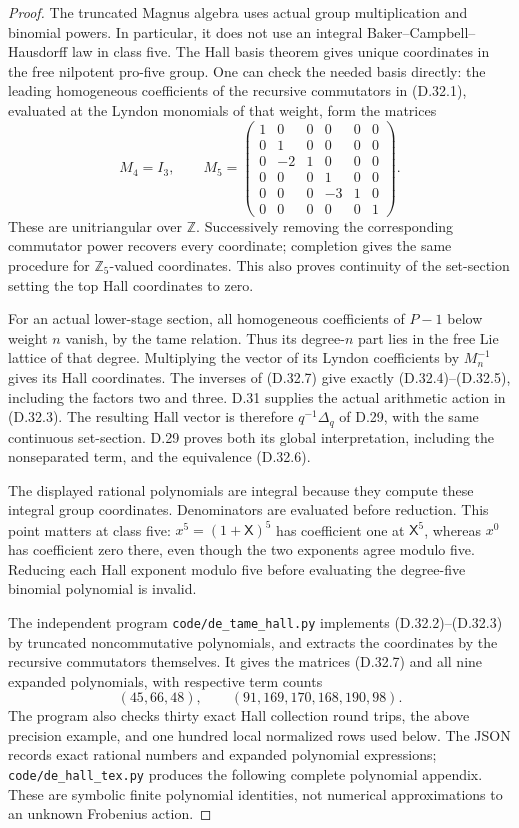 \begin{proof}
The truncated Magnus algebra uses actual group
multiplication and binomial powers. In particular,
it does not use an integral Baker--Campbell--Hausdorff
law in class five. The Hall basis theorem gives
unique coordinates in the free nilpotent
pro-five group. One can check the needed basis
directly: the leading homogeneous coefficients
of the recursive commutators in (D.32.1),
evaluated at the Lyndon monomials of that weight,
form the matrices
\[
 M_4=I_3,\qquad
 M_5=\begin{pmatrix}
 1&0&0&0&0&0\\
 0&1&0&0&0&0\\
 0&-2&1&0&0&0\\
 0&0&0&1&0&0\\
 0&0&0&-3&1&0\\
 0&0&0&0&0&1
 \end{pmatrix}.                                \tag{D.32.7}
\]
These are unitriangular over \(\mathbb Z\).
Successively removing the corresponding
commutator power recovers every coordinate;
completion gives the same procedure for
\(\mathbb Z_5\)-valued coordinates. This also
proves continuity of the set-section setting
the top Hall coordinates to zero.

For an actual lower-stage section, all
homogeneous coefficients of \(P-1\) below
weight \(n\) vanish, by the tame relation.
Thus its degree-\(n\) part lies in the free
Lie lattice of that degree. Multiplying the
vector of its Lyndon coefficients by
\(M_n^{-1}\) gives its Hall coordinates.
The inverses of (D.32.7) give exactly
(D.32.4)--(D.32.5), including the factors
two and three. D.31 supplies the actual
arithmetic action in (D.32.3). The resulting
Hall vector is therefore \(q^{-1}\Delta_q\)
of D.29, with the same continuous set-section.
D.29 proves both its global interpretation,
including the nonseparated term, and the
equivalence (D.32.6).

The displayed rational polynomials are integral
because they compute these integral group
coordinates. Denominators are evaluated before
reduction. This point matters at class five:
\(x^5=(1+\mathsf X)^5\) has coefficient one
at \(\mathsf X^5\), whereas \(x^0\) has
coefficient zero there, even though the two
exponents agree modulo five. Reducing each
Hall exponent modulo five before evaluating
the degree-five binomial polynomial is invalid.

The independent program
\texttt{code/de\_tame\_hall.py} implements
(D.32.2)--(D.32.3) by truncated noncommutative
polynomials, and extracts the coordinates by
the recursive commutators themselves. It gives
the matrices (D.32.7) and all nine expanded
polynomials, with respective term counts
\[
        (45,66,48),\qquad
        (91,169,170,168,190,98).
\]
The program also checks thirty exact Hall
collection round trips, the above precision
example, and one hundred local normalized
rows used below. The JSON records exact rational
numbers and expanded polynomial expressions;
\texttt{code/de\_hall\_tex.py} produces the
following complete polynomial appendix.
These are symbolic finite polynomial identities,
not numerical approximations to an unknown
Frobenius action.


\end{proof}

